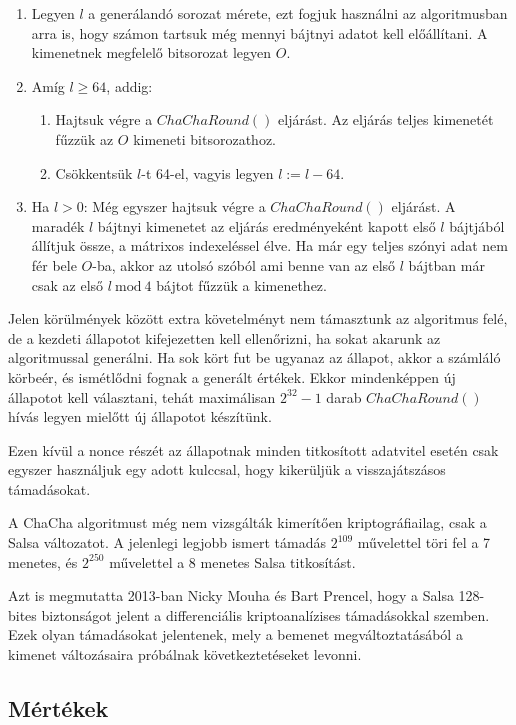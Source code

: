 \documentclass[hidelinks, 12pt]{article}
\begin{document}
	\begin{enumerate}
		\item Legyen $l$ a generálandó sorozat mérete, ezt fogjuk használni az algoritmusban arra is, hogy számon tartsuk még mennyi bájtnyi adatot kell előállítani. A kimenetnek megfelelő bitsorozat legyen $O$.
		\item Amíg $l \geq 64$, addig:
		\begin{enumerate}
			\item Hajtsuk végre a $ChaChaRound()$ eljárást. Az eljárás teljes kimenetét fűzzük az $O$ kimeneti bitsorozathoz.
			\item Csökkentsük $l$-t 64-el, vagyis legyen $l := l - 64$.
		\end{enumerate}
		\item Ha $l > 0$: Még egyszer hajtsuk végre a $ChaChaRound()$ eljárást. A maradék $l$ bájtnyi kimenetet az eljárás eredményeként kapott első $l$ bájtjából állítjuk össze, a mátrixos indexeléssel élve. Ha már egy teljes szónyi adat nem fér bele $O$-ba, akkor az utolsó szóból ami benne van az első $l$ bájtban már csak az első $l \ \textrm{mod} \ 4$ bájtot fűzzük a kimenethez.
	\end{enumerate} 
	Jelen körülmények között extra követelményt nem támasztunk az algoritmus felé, de a kezdeti állapotot kifejezetten kell ellenőrizni, ha sokat akarunk az algoritmussal generálni. Ha sok kört fut be ugyanaz az állapot, akkor a számláló körbeér, és ismétlődni fognak a generált értékek. Ekkor mindenképpen új állapotot kell választani, tehát maximálisan $2^{32}-1$ darab $ChaChaRound()$ hívás legyen mielőtt új állapotot készítünk.
	
	Ezen kívül a nonce részét az állapotnak minden titkosított adatvitel esetén csak egyszer használjuk egy adott kulccsal, hogy kikerüljük a visszajátszásos támadásokat.
	
	A ChaCha algoritmust még nem vizsgálták kimerítően kriptográfiailag, csak a Salsa változatot. A jelenlegi legjobb ismert támadás $2^{109}$ művelettel töri fel a 7 menetes, és $2^{250}$ művelettel a 8 menetes Salsa titkosítást. \cite{salsaattack}
	
	Azt is megmutatta 2013-ban Nicky Mouha és Bart Prencel, hogy a Salsa 128-bites biztonságot jelent a differenciális kriptoanalízises támadásokkal szemben. \cite{salsadiffcrypt} Ezek olyan támadásokat jelentenek, mely a bemenet megváltoztatásából a kimenet változásaira próbálnak következtetéseket levonni.
	\subsection{Mértékek}
\end{document}
